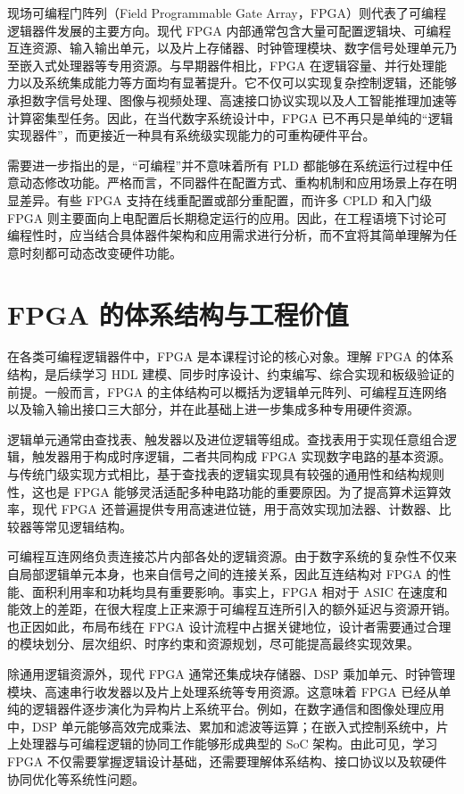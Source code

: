 现场可编程门阵列（Field Programmable Gate
Array，FPGA）则代表了可编程逻辑器件发展的主要方向。现代 FPGA
内部通常包含大量可配置逻辑块、可编程互连资源、输入输出单元，以及片上存储器、时钟管理模块、数字信号处理单元乃至嵌入式处理器等专用资源。与早期器件相比，FPGA
在逻辑容量、并行处理能力以及系统集成能力等方面均有显著提升。它不仅可以实现复杂控制逻辑，还能够承担数字信号处理、图像与视频处理、高速接口协议实现以及人工智能推理加速等计算密集型任务。因此，在当代数字系统设计中，FPGA
已不再只是单纯的``逻辑实现器件''，而更接近一种具有系统级实现能力的可重构硬件平台。

需要进一步指出的是，``可编程''并不意味着所有 PLD
都能够在系统运行过程中任意动态修改功能。严格而言，不同器件在配置方式、重构机制和应用场景上存在明显差异。有些
FPGA 支持在线重配置或部分重配置，而许多 CPLD 和入门级 FPGA
则主要面向上电配置后长期稳定运行的应用。因此，在工程语境下讨论可编程性时，应当结合具体器件架构和应用需求进行分析，而不宜将其简单理解为任意时刻都可动态改变硬件功能。

\section{FPGA
的体系结构与工程价值}\label{fpga-ux7684ux4f53ux7cfbux7ed3ux6784ux4e0eux5de5ux7a0bux4ef7ux503c}

在各类可编程逻辑器件中，FPGA 是本课程讨论的核心对象。理解 FPGA
的体系结构，是后续学习 HDL
建模、同步时序设计、约束编写、综合实现和板级验证的前提。一般而言，FPGA
的主体结构可以概括为逻辑单元阵列、可编程互连网络以及输入输出接口三大部分，并在此基础上进一步集成多种专用硬件资源。

逻辑单元通常由查找表、触发器以及进位逻辑等组成。查找表用于实现任意组合逻辑，触发器用于构成时序逻辑，二者共同构成
FPGA
实现数字电路的基本资源。与传统门级实现方式相比，基于查找表的逻辑实现具有较强的通用性和结构规则性，这也是
FPGA 能够灵活适配多种电路功能的重要原因。为了提高算术运算效率，现代 FPGA
还普遍提供专用高速进位链，用于高效实现加法器、计数器、比较器等常见逻辑结构。

可编程互连网络负责连接芯片内部各处的逻辑资源。由于数字系统的复杂性不仅来自局部逻辑单元本身，也来自信号之间的连接关系，因此互连结构对
FPGA 的性能、面积利用率和功耗均具有重要影响。事实上，FPGA 相对于 ASIC
在速度和能效上的差距，在很大程度上正来源于可编程互连所引入的额外延迟与资源开销。也正因如此，布局布线在
FPGA
设计流程中占据关键地位，设计者需要通过合理的模块划分、层次组织、时序约束和资源规划，尽可能提高最终实现效果。

除通用逻辑资源外，现代 FPGA 通常还集成块存储器、DSP
乘加单元、时钟管理模块、高速串行收发器以及片上处理系统等专用资源。这意味着
FPGA
已经从单纯的逻辑器件逐步演化为异构片上系统平台。例如，在数字通信和图像处理应用中，DSP
单元能够高效完成乘法、累加和滤波等运算；在嵌入式控制系统中，片上处理器与可编程逻辑的协同工作能够形成典型的
SoC 架构。由此可见，学习 FPGA
不仅需要掌握逻辑设计基础，还需要理解体系结构、接口协议以及软硬件协同优化等系统性问题。

